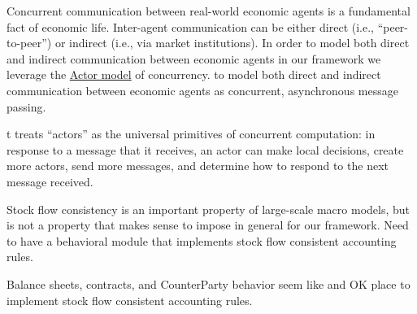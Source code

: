 \documentclass[11pt]{amsart}
\begin{document}
Concurrent communication between real-world economic agents is a fundamental fact of economic life. Inter-agent communication can be either direct (i.e., ``peer-to-peer'') or indirect (i.e., via market institutions). In order to model both direct and indirect communication between economic agents in our framework we leverage the \href{https://en.wikipedia.org/wiki/Actor_model}{Actor model} of concurrency.   to model both direct and indirect communication between economic agents as concurrent, asynchronous message passing.

t treats ``actors'' as the universal primitives of concurrent computation: in response to a message that it receives, an actor can make local decisions, create more actors, send more messages, and determine how to respond to the next message received.

Stock flow consistency is an important property of large-scale macro models, but is not a property that makes sense to impose in general for our framework.  Need to have a behavioral module that implements stock flow consistent accounting rules.

Balance sheets, contracts, and CounterParty behavior seem like and OK place to implement stock flow consistent accounting rules.


\end{document}

